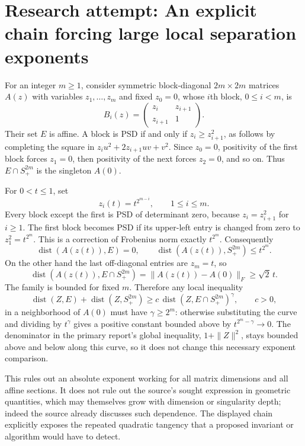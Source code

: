 \documentclass[11pt]{article}
\begin{document}
\section{Research attempt: An explicit chain forcing large local separation exponents}

For an integer $m\geq1$, consider symmetric block-diagonal $2m\times2m$ matrices $A(z)$ with variables $z_1,\ldots,z_m$ and fixed $z_0=0$, whose $i$th block, $0\leq i<m$, is
\[
B_i(z)=\begin{pmatrix}z_i&z_{i+1}\\z_{i+1}&1\end{pmatrix}.
\]
Their set $E$ is affine. A block is PSD if and only if $z_i\geq z_{i+1}^2$, as follows by completing the square in $z_i u^2+2z_{i+1}uv+v^2$. Since $z_0=0$, positivity of the first block forces $z_1=0$, then positivity of the next forces $z_2=0$, and so on. Thus $E\cap S_+^{2m}$ is the singleton $A(0)$.

For $0<t\leq1$, set
\[
z_i(t)=t^{2^{m-i}},\qquad 1\leq i\leq m.
\]
Every block except the first is PSD of determinant zero, because $z_i=z_{i+1}^2$ for $i\geq1$. The first block becomes PSD if its upper-left entry is changed from zero to $z_1^2=t^{2^m}$. This is a correction of Frobenius norm exactly $t^{2^m}$. Consequently
\[
\operatorname{dist}(A(z(t)),E)=0,\qquad
\operatorname{dist}(A(z(t)),S_+^{2m})\leq t^{2^m}.
\]
On the other hand the last off-diagonal entries are $z_m=t$, so
\[
\operatorname{dist}(A(z(t)),E\cap S_+^{2m})
=\|A(z(t))-A(0)\|_F\geq\sqrt2\,t.
\]
The family is bounded for fixed $m$. Therefore any local inequality
\[
\operatorname{dist}(Z,E)+\operatorname{dist}(Z,S_+^{2m})
\geq c\,\operatorname{dist}(Z,E\cap S_+^{2m})^\gamma,
\qquad c>0,
\]
in a neighborhood of $A(0)$ must have $\gamma\geq2^m$: otherwise substituting the curve and dividing by $t^\gamma$ gives a positive constant bounded above by $t^{2^m-\gamma}\to0$. The denominator in the primary report's global inequality, $1+\|Z\|^2$, stays bounded above and below along this curve, so it does not change this necessary exponent comparison.

This rules out an absolute exponent working for all matrix dimensions and all affine sections. It does not rule out the source's sought expression in geometric quantities, which may themselves grow with dimension or singularity depth; indeed the source already discusses such dependence. The displayed chain explicitly exposes the repeated quadratic tangency that a proposed invariant or algorithm would have to detect.
\end{document}
